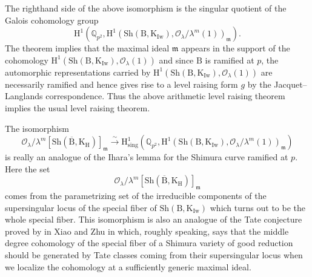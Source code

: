 \documentclass[10pt]{amsart}
\numberwithin{equation}{section}
\theoremstyle{definition}
\def\calO{\mathcal{O}}
\def\fracm{\mathfrak{m}}
\def\QQ{\mathbb{Q}}
\def\rmB{\mathrm{B}}
\def\rmH{\mathrm{H}}
\def\rmK{\mathrm{K}}
\def\Iw{\mathrm{Iw}}
\def\Sh{\mathrm{Sh}}
\begin{document}
The righthand side of the above isomorphism is the singular quotient of the Galois cohomology group 
\begin{equation*}
\rmH^{1}(\QQ_{p^{2}}, \rmH^{1}(\Sh(\rmB, \rmK_{\Iw}), \calO_{\lambda}/\lambda^{m}(1))_{\fracm}). 
\end{equation*}
The theorem implies that the maximal ideal $\fracm$ appears in the support of the cohomology $\rmH^{1}(\Sh(\rmB, \rmK_{\Iw}), \calO_{\lambda}(1))$ and since $\rmB$ is ramified at $p$, the automorphic representations carried by $\rmH^{1}(\Sh(\rmB, \rmK_{\Iw}), \calO_{\lambda}(1))$ are necessarily ramified and hence gives rise to a level raising form $g$ by the Jacquet--Langlands correspondence. Thus the above arithmetic level raising theorem implies the usual level raising theorem.

The isomorphism 
\begin{equation*}
\calO_{\lambda}/\lambda^{m}[\Sh(\overline{\rmB}, \rmK_{\rmH})]_{\fracm}\xrightarrow{\sim} \rmH^{1}_{\mathrm{sing}}(\QQ_{p^{2}}, \rmH^{1}(\Sh(\rmB, \rmK_{\Iw}), \calO_{\lambda}/\lambda^{m}(1))_{\fracm})
\end{equation*}
is really an analogue of the Ihara's lemma for the Shimura curve ramified at $p$. Here the set 
\begin{equation*}
\calO_{\lambda}/\lambda^{m}[\Sh(\overline{\rmB}, \rmK_{\rmH})]_{\fracm}
\end{equation*}
comes from the parametrizing set of the irreducible components of the supersingular locus of the special fiber of $\Sh(\rmB, \rmK_{\Iw})$ which turns out to be the whole special fiber. This isomorphism is also an analogue of the Tate conjecture proved by in Xiao and Zhu in \cite{XZ} which, roughly speaking, says that the middle degree cohomology of the special fiber of a Shimura variety of good reduction should be generated by Tate classes coming from their supersingular locus when we localize the cohomology at a sufficiently generic maximal ideal.
\end{document}
